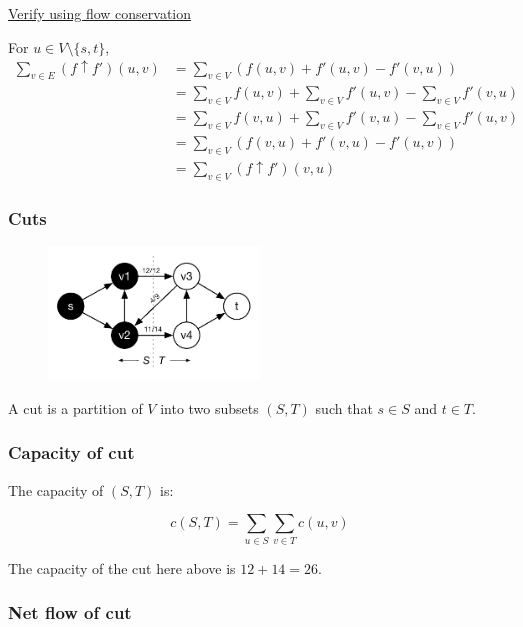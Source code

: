 \documentclass[12pt]{article}
\begin{document}
\underline{Verify using flow conservation}

For $u \in V \setminus \{s,t\}$,
\begin{align*}
  \sum_{v \in E}(f \uparrow f')(u,v) &= \sum_{v \in V}(f(u,v) + f'(u,v) - f'(v,u)) \\
                                     &= \sum_{v \in V}f(u,v) + \sum_{v \in V}f'(u,v) - \sum_{v \in V}f'(v,u) \\
                                     &= \sum_{v \in V}f(v,u) + \sum_{v \in V}f'(v,u) - \sum_{v \in V}f'(u,v) \\
                                     &= \sum_{v \in V}(f(v,u) + f'(v,u) - f'(u,v)) \\
                                     &= \sum_{v \in V}(f \uparrow f')(v,u)
\end{align*}


\subsubsection*{Cuts}

\begin{figure}[h!]
  \centering
    \includegraphics[width=0.5\textwidth]{figures/5}
\end{figure}

A cut is a partition of $V$ into two subsets $(S,T)$ such that $s \in S$ and $t \in T$.

\subsubsection*{Capacity of cut}

The capacity of $(S,T)$ is:

  $$ c(S,T) = \sum_{u \in S}\sum_{v \in T} c(u,v) $$

The capacity of the cut here above is $12 + 14 = 26$.

\subsubsection*{Net flow of cut}
\end{document}
